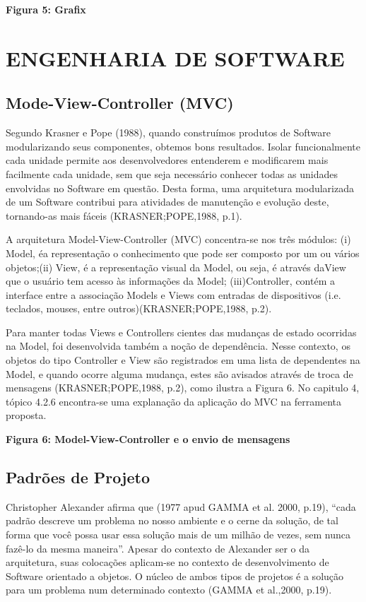 \textbf{Figura 5: Grafix}



\section{ENGENHARIA DE SOFTWARE}
\subsection{Mode-View-Controller (MVC)}

Segundo Krasner e Pope (1988), quando construímos produtos de Software modularizando seus componentes, obtemos bons resultados. Isolar funcionalmente cada unidade permite aos desenvolvedores entenderem e modificarem mais facilmente cada unidade, sem que seja necessário conhecer todas as unidades envolvidas no Software em questão. Desta forma, uma arquitetura modularizada de um Software contribui para atividades de manutenção e evolução deste, tornando-as mais fáceis (KRASNER;POPE,1988, p.1).


A arquitetura Model-View-Controller (MVC) concentra-se nos três módulos: (i) Model, éa representação o conhecimento que pode ser composto por um ou vários objetos;(ii) View, é a representação visual da Model, ou seja, é através daView que o usuário tem acesso às informações da Model; (iii)Controller, contém a interface entre a associação Models e Views com entradas de dispositivos (i.e. teclados, mouses, entre outros)(KRASNER;POPE,1988, p.2).

Para manter todas Views e Controllers cientes das mudanças de estado ocorridas na Model, foi desenvolvida também a noção de dependência. Nesse contexto, os objetos do tipo Controller e View são registrados em uma lista de dependentes na Model, e quando ocorre alguma mudança, estes são avisados através de troca de mensagens (KRASNER;POPE,1988, p.2), como ilustra a Figura 6. No capitulo 4, tópico 4.2.6 encontra-se uma explanação da aplicação do MVC na ferramenta proposta.

\textbf{Figura 6: Model-View-Controller e o envio de mensagens}

\subsection{Padrões de Projeto}

Christopher Alexander afirma que (1977 apud GAMMA et al. 2000, p.19), “cada padrão descreve um problema no nosso ambiente e o cerne da solução, de tal forma que você possa usar essa solução mais de um milhão de vezes, sem nunca fazê-lo da mesma maneira”. Apesar do contexto de Alexander ser o da arquitetura, suas colocações aplicam-se no contexto de desenvolvimento de Software orientado a objetos. O núcleo de ambos tipos de projetos é a solução para um problema num determinado contexto (GAMMA et al.,2000, p.19).


